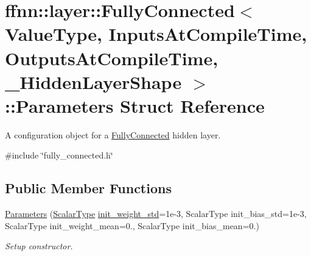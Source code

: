\hypertarget{structffnn_1_1layer_1_1_fully_connected_1_1_parameters}{\section{ffnn\-:\-:layer\-:\-:Fully\-Connected$<$ Value\-Type, Inputs\-At\-Compile\-Time, Outputs\-At\-Compile\-Time, \-\_\-\-Hidden\-Layer\-Shape $>$\-:\-:Parameters Struct Reference}
\label{structffnn_1_1layer_1_1_fully_connected_1_1_parameters}
}


A configuration object for a \hyperlink{classffnn_1_1layer_1_1_fully_connected}{Fully\-Connected} hidden layer.  




{\ttfamily \#include \char`\"{}fully\-\_\-connected.\-h\char`\"{}}

\subsection*{Public Member Functions}
\begin{DoxyCompactItemize}
\item 
\hyperlink{structffnn_1_1layer_1_1_fully_connected_1_1_parameters_a9c2d0124f46016f9bde7115a47f06ec8}{Parameters} (\hyperlink{classffnn_1_1layer_1_1_fully_connected_aa5e1875ec3ea63c90655419e7dd32a55}{Scalar\-Type} \hyperlink{structffnn_1_1layer_1_1_fully_connected_1_1_parameters_a9f74c8450bd5a7c86a3d03bd3512b6a5}{init\-\_\-weight\-\_\-std}=1e-\/3, Scalar\-Type init\-\_\-bias\-\_\-std=1e-\/3, Scalar\-Type init\-\_\-weight\-\_\-mean=0., Scalar\-Type init\-\_\-bias\-\_\-mean=0.)
\begin{DoxyCompactList}\small\item\em Setup constructor. \end{DoxyCompactList}\end{DoxyCompactItemize}
